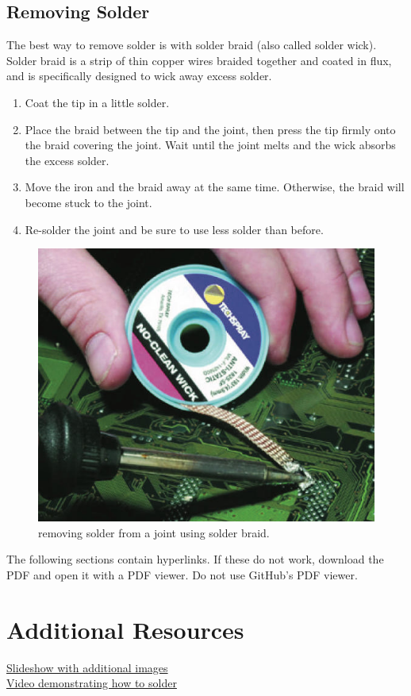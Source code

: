 \subsection{Removing Solder}
The best way to remove solder is with solder braid (also called solder wick). Solder braid is a strip of thin copper wires braided together and coated in flux, and is specifically designed to wick away excess solder.
\begin{enumerate}
    \item Coat the tip in a little solder.
    \item Place the braid between the tip and the joint, then press the tip firmly onto the braid covering the joint. Wait until the joint melts and the wick absorbs the excess solder.
    \item Move the iron and the braid away at the same time. Otherwise, the braid will become stuck to the joint.
    \item Re-solder the joint and be sure to use less solder than before.
\end{enumerate}
\begin{figure}[h]
    \caption{removing solder from a joint using solder braid.}
    \centering \includegraphics[scale=0.5]{images/wicking.jpg}
\end{figure}

\noindent The following sections contain hyperlinks. If these do not work, download the PDF and open it with a PDF viewer. Do not use GitHub's PDF viewer.

\section{Additional Resources}
\href{https://docs.google.com/presentation/d/1gsUb53UJUmAFMdqCDinAuhG2tvJvpA0dKFnbgJBPr4M/edit?usp=sharing}{Slideshow with additional images} \\
\href{https://www.youtube.com/watch?v=VxMV6wGS3NY}{Video demonstrating how to solder}

